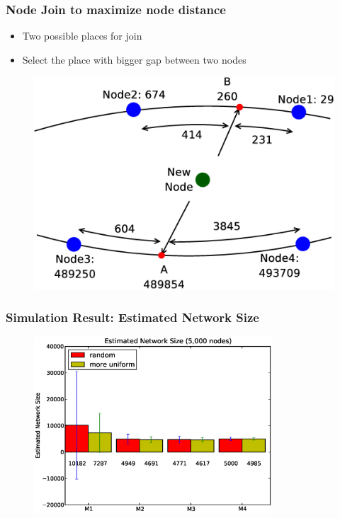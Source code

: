 \documentclass[red]{beamer}
\begin{document}
\begin{frame}
\frametitle{Node Join to maximize node distance}
\begin{itemize}
\item Two possible places for join 
\item Select the place with bigger gap between two nodes
\end{itemize}
\begin{figure}
\center
\includegraphics[angle=0,scale=0.2]{figs/evenNet}
\end{figure}
\end{frame}
\begin{frame}
\frametitle{Simulation Result: Estimated Network Size}
\begin{figure}
\centering
\includegraphics[width=3.5in]{figs/size5k}
\end{figure}
\end{frame}
\end{document}
